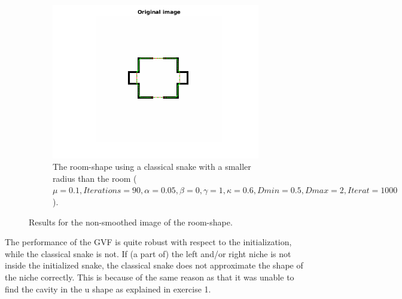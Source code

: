 \documentclass{article}
\begin{document}
\begin{figure}
\begin{subfigure}{0.49\textwidth}
  \centering
  \includegraphics[width=\linewidth]{fig3c.png}
  \caption{The room-shape using a classical snake with a smaller radius than the room ($\mu=0.1, Iterations=90, \alpha=0.05, \beta=0, \gamma=1,\kappa=0.6,Dmin=0.5,Dmax=2,Iterat=1000$).}
  \label{fig3c}
\end{subfigure}
\caption{Results for the non-smoothed image of the room-shape.}
\label{fig3}
\end{figure}

The performance of the GVF is quite robust with respect to the initialization, while the classical snake is not. If (a part of) the left and/or right niche is not inside the initialized snake, the classical snake does not approximate the shape of the niche correctly. This is because of the same reason as that it was unable to find the cavity in the u shape as explained in exercise 1.

\subsection{}
\end{document}
